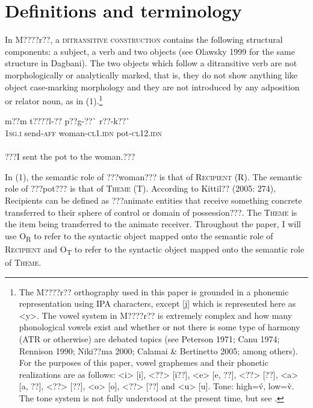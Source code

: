 \documentclass[output=paper]{langsci/langscibook}
\begin{document}
\section{Definitions and terminology}

In M????r??, a \textsc{ditransitive construction} contains the following structural components: a subject, a verb and two objects (see Olawsky 1999 for the same structure in Dagbani). The two objects which follow a ditransitive verb are not morphologically or analytically marked, that is, they do not show anything like object case-marking morphology and they are not introduced by any adposition or relator noun, as in (1).\footnote{ {The M????r?? orthography used in this paper is grounded in a phonemic representation using IPA characters, except [j] which is represented here as {\textless}y{\textgreater}. The vowel system in M????r?? is extremely complex and how many phonological vowels exist and whether or not there is some type of harmony (ATR or otherwise) are debated topics (see Peterson 1971; Canu 1974; Rennison 1990; Niki??ma 2000; Calamai \& Bertinetto 2005; among others). For the purposes of this paper, vowel graphemes and their phonetic realizations are as follows: {\textless}i{\textgreater} [i], {\textless}??{\textgreater} [i??], {\textless}e{\textgreater} [e, ??], {\textless}??{\textgreater} [??], {\textless}a{\textgreater} [a, ??], {\textless}??{\textgreater} [??], {\textless}o{\textgreater} [o], {\textless}??{\textgreater} [??] and {\textless}u{\textgreater} [u]. Tone: high=\'{v}, low=\`{v}. The tone system is not fully understood at the present time, but see \citet{Peterson1971}.} }


\ea \gll 
\label{bkm:Ref424141523}m??m    t????l-??        p??g-??\`{ }             r??-k??\`{ }\\
\textsc{1sg.i}    send-\textsc{aff}      woman-\textsc{cl1.idn}       pot-\textsc{cl12.idn}\\
\\\glt ???I sent the pot to the woman.???  
\z

In (1), the semantic role of ???woman??? is that of \textsc{Recipient} (R).  The semantic role of ???pot??? is that of \textsc{Theme} (T). According to Kittil?? (2005: 274), Recipients can be defined as ???animate entities that receive something concrete transferred to their sphere of control or domain of possession???. The \textsc{Theme} is the item being transferred to the animate receiver. Throughout the paper, I will use O\textsubscript{R} to refer to the syntactic object mapped onto the semantic role of \textsc{Recipient} and O\textsubscript{T }to refer to the syntactic object mapped onto the semantic role of \textsc{Theme}. 
\end{document}
